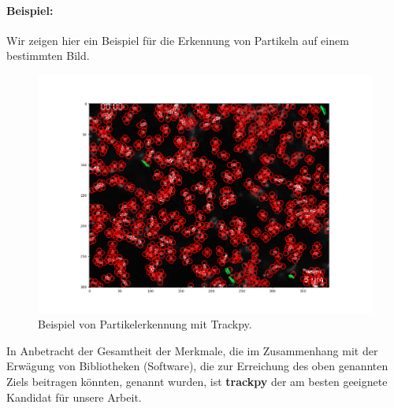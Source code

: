 	\paragraph{Beispiel:}
	Wir zeigen hier ein Beispiel für die Erkennung von Partikeln auf einem bestimmten Bild.\\
	\begin{figure}[H]
    \centering
    \includegraphics[scale=0.35]{Grafiken/trackpyBilder/locate(f0, diameter=3).png}
    \caption{Beispiel von Partikelerkennung mit Trackpy.}
    \label{fig:kap1_Trackpy_beispiel}
\end{figure}
	
In Anbetracht der Gesamtheit der Merkmale, die im Zusammenhang mit der Erwägung von Bibliotheken (Software), die zur Erreichung des oben genannten Ziels beitragen könnten, genannt wurden, ist \textbf{trackpy} der am besten geeignete Kandidat für unsere Arbeit. 

